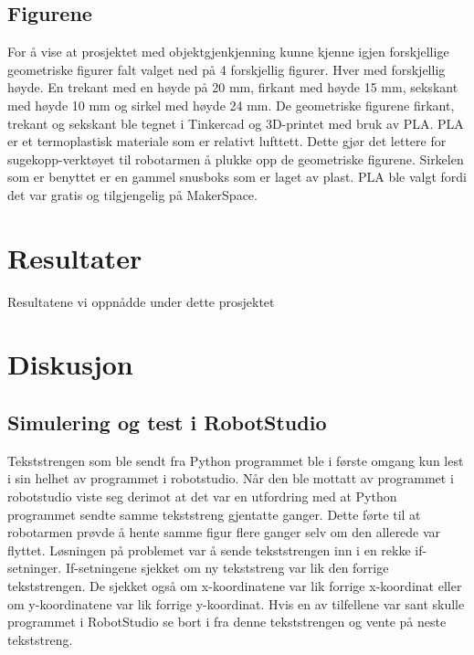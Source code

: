 \documentclass[conference]{IEEEtran}
\begin{document}
    \subsection{Figurene}
        For å vise at prosjektet med objektgjenkjenning kunne kjenne igjen forskjellige geometriske figurer falt valget ned på 4 forskjellig figurer. 
        Hver med forskjellig høyde. En trekant med en høyde på 20 mm, firkant med høyde 15 mm, sekskant med høyde 10 mm og sirkel med høyde 24 mm. 
        De geometriske figurene firkant, trekant og sekskant ble tegnet i Tinkercad \cite{metode:tinkercad} og 3D-printet med bruk av PLA. PLA er et termoplastisk materiale 
        som er relativt lufttett. Dette gjør det lettere for sugekopp-verktøyet til robotarmen å plukke opp de geometriske figurene. Sirkelen som er 
        benyttet er en gammel snusboks som er laget av plast. PLA ble valgt fordi det var gratis og tilgjengelig på MakerSpace.

        
\section{Resultater}
    Resultatene vi oppnådde under dette prosjektet
    
\section{Diskusjon}
    \subsection{Simulering og test i RobotStudio}
        Tekststrengen som ble sendt fra Python programmet ble i første omgang kun lest i sin helhet av programmet i robotstudio. Når den ble mottatt 
        av programmet i robotstudio viste seg derimot at det var en utfordring med at Python programmet sendte samme tekststreng gjentatte ganger. 
        Dette førte til at robotarmen prøvde å hente samme figur flere ganger selv om den allerede var flyttet. Løsningen på problemet var å sende 
        tekststrengen inn i en rekke if-setninger. If-setningene sjekket om ny tekststreng var lik den forrige tekststrengen. De sjekket også om 
        x-koordinatene var lik forrige x-koordinat eller om y-koordinatene var lik forrige y-koordinat. Hvis en av tilfellene var sant skulle 
        programmet i RobotStudio se bort i fra denne tekststrengen og vente på neste tekststreng.
\end{document}
